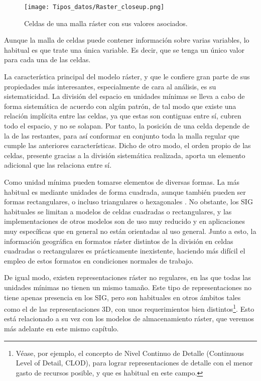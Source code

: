 \begin{multicols}{2}
\begin{figure*}[ht]
\centering
\texttt{[image: Tipos\_datos/Raster\_closeup.png]}
\caption{\small Celdas de una malla ráster con sus valores asociados.}
\label{Fig:Raster_closeup} 
\end{figure*}

Aunque la malla de celdas puede contener información sobre varias variables, lo habitual es que trate una única variable. Es decir, que se tenga un único valor para cada una de las celdas.

La característica principal del modelo ráster, y que le confiere gran parte de sus propiedades más interesantes, especialmente de cara al análisis, es su sistematicidad. La división del espacio en unidades mínimas se lleva a cabo de forma sistemática de acuerdo con algún patrón, de tal modo que existe una relación implícita entre las celdas, ya que estas son contiguas entre sí, cubren todo el espacio, y no se solapan. Por tanto, la posición de una celda depende de la de las restantes, para así conformar en conjunto toda la malla regular que cumple las anteriores características. Dicho de otro modo, el orden propio de las celdas, presente gracias a la división sistemática realizada, aporta un elemento adicional que las relaciona entre sí.

Como unidad mínima pueden tomarse elementos de diversas formas. La más habitual es mediante unidades de forma cuadrada, aunque también pueden ser formas rectangulares, o incluso triangulares o hexagonales \cite{Diaz1986Reading}. No obstante, los SIG habituales se limitan a modelos de celdas cuadradas o rectangulares, y las implementaciones de otros modelos son de uso muy reducido y en aplicaciones muy específicas que en general no están orientadas al uso general. Junto a esto, la información geográfica en formatos ráster distintos de la división en celdas cuadradas o rectangulares es prácticamente inexistente, haciendo más difícil el empleo de estos formatos en condiciones normales de trabajo.

De igual modo, existen representaciones ráster no regulares, en las que todas las unidades mínimas no tienen un mismo tamaño. Este tipo de representaciones no tiene apenas presencia en los SIG, pero son habituales en otros ámbitos tales como el de las representaciones 3D, con unos requerimientos bien distintos\footnote{Véase, por ejemplo, el concepto de Nivel Continuo de Detalle (Continuous Level of Detail, CLOD), para lograr representaciones de detalle con el menor gasto de recursos posible, y que es habitual en este campo.}. Esto está relacionado a su vez con los modelos de almacenamiento ráster, que veremos más adelante en este mismo capítulo.


\end{multicols}
